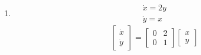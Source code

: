 \documentclass[a4paper,10pt]{article}
\begin{document}
\begin{enumerate}
\begin{enumerate}
                
            \item 
                \begin{equation}
                    \begin{aligned}
                        \dot{x}= 2y\\
                        \dot{y}= x
                    \end{aligned}
                \end{equation}
                \begin{equation}
                    \begin{bmatrix}
                        \dot{x}\\
                        \dot{y}
                    \end{bmatrix}
                    =
                    \begin{bmatrix}
                        0 & 2\\
                        0 & 1
                    \end{bmatrix}
                    \begin{bmatrix}
                        x\\
                        y
                    \end{bmatrix}
                    

\end{equation}
\end{enumerate}
\end{enumerate}
\end{document}
